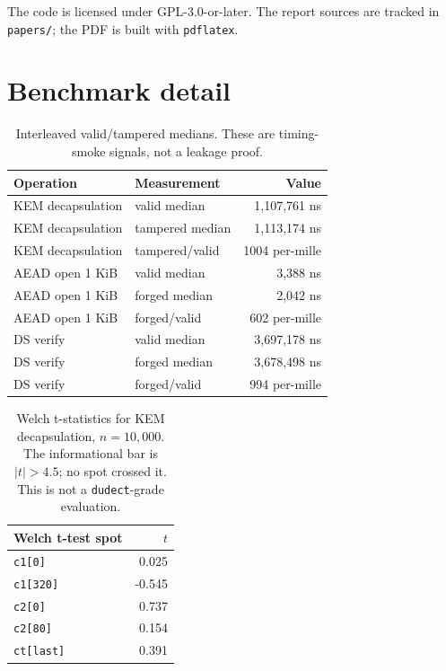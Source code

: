 \documentclass[runningheads]{llncs}
\begin{document}
The code is licensed under GPL-3.0-or-later.  The report sources are
tracked in \texttt{papers/}; the PDF is built with \texttt{pdflatex}.


\section{Benchmark detail}
\label{app:bench}

\begin{table}[t]
\centering
\small
\begin{tabular}{@{}llr@{}}
\toprule
Operation & Measurement & Value \\
\midrule
KEM decapsulation & valid median & 1,107,761 ns \\
KEM decapsulation & tampered median & 1,113,174 ns \\
KEM decapsulation & tampered/valid & 1004 per-mille \\
AEAD open 1 KiB & valid median & 3,388 ns \\
AEAD open 1 KiB & forged median & 2,042 ns \\
AEAD open 1 KiB & forged/valid & 602 per-mille \\
DS verify & valid median & 3,697,178 ns \\
DS verify & forged median & 3,678,498 ns \\
DS verify & forged/valid & 994 per-mille \\
\bottomrule
\end{tabular}
\caption{Interleaved valid/tampered medians.  These are timing-smoke
signals, not a leakage proof.}
\label{tab:medians}
\end{table}

\begin{table}[t]
\centering
\small
\begin{tabular}{@{}lr@{}}
\toprule
Welch t-test spot & $t$ \\
\midrule
\texttt{c1[0]} & 0.025 \\
\texttt{c1[320]} & -0.545 \\
\texttt{c2[0]} & 0.737 \\
\texttt{c2[80]} & 0.154 \\
\texttt{ct[last]} & 0.391 \\
\bottomrule
\end{tabular}
\caption{Welch t-statistics for KEM decapsulation, $n=10{,}000$.
The informational bar is $|t|>4.5$; no spot crossed it.  This is not a
\texttt{dudect}-grade evaluation.}
\label{tab:ttest}
\end{table}
\end{document}
